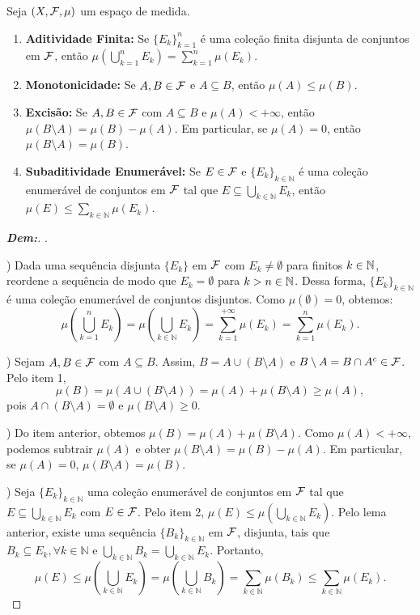 \begin{prop*}{}
Seja $(X, \mathcal{F}, \mu)$ um espaço de medida.
\begin{enumerate}
    \item[1)] \textbf{Aditividade Finita:} Se $\{E_k\}_{k=1}^n$ é uma coleção finita disjunta de conjuntos em $\mathcal{F}$, então $\mu\left(\bigcup_{k=1}^n E_k\right) = \sum_{k=1}^n \mu(E_k)$.
    \item[2)] \textbf{Monotonicidade:} Se $A, B \in \mathcal{F}$ e $A \subseteq B$, então $\mu(A) \le \mu(B)$.
    \item[3)] \textbf{Excisão:} Se $A, B \in \mathcal{F}$ com $A \subseteq B$ e $\mu(A) < +\infty$, então $\mu(B \setminus A) = \mu(B) - \mu(A)$. Em particular, se $\mu(A) = 0$, então $\mu(B \setminus A) = \mu(B)$.
    \item[4)] \textbf{Subaditividade Enumerável:} Se $E \in \mathcal{F}$ e $\{E_k\}_{k \in \mathbb{N}}$ é uma coleção enumerável de conjuntos em $\mathcal{F}$ tal que $E \subseteq \bigcup_{k \in \mathbb{N}} E_k$, então $\mu(E) \le \sum_{k \in \mathbb{N}} \mu(E_k)$.
\end{enumerate}
\end{prop*}

\begin{proof}[\textbf{Dem:}]. 

) Dada uma sequência disjunta $\{E_k\}$ em $\mathcal F$
  com $E_k \neq \emptyset$ para finitos $k \in \mathbb N$, 
  reordene a sequência de modo que $E_k = \emptyset$ para $k > n \in \mathbb N$. 
  Dessa forma, $\{E_k\}_{k \in \mathbb{N}}$ é uma coleção enumerável
  de conjuntos disjuntos. Como $\mu(\emptyset) = 0$, obtemos:
$$ \mu\left(\bigcup_{k=1}^n E_k\right) = \mu\left(\bigcup_{k \in \mathbb{N}} E_k\right) = \sum_{k=1}^{+\infty} \mu(E_k) = \sum_{k=1}^n \mu(E_k). $$

) Sejam $A, B \in \mathcal{F}$ com $A \subseteq B$. Assim, $B = A \cup (B \setminus A)$ e $B \setminus A = B \cap A^c \in \mathcal{F}$. Pelo item 1,
$$ \mu(B) = \mu(A \cup (B \setminus A)) = \mu(A) + \mu(B \setminus A) \ge \mu(A), $$
pois $A \cap (B \setminus A) = \emptyset$ e $\mu(B \setminus A) \ge 0$.

) Do item anterior, obtemos $\mu(B) = \mu(A) + \mu(B \setminus A)$. Como $\mu(A) < +\infty$, podemos subtrair $\mu(A)$ e obter $\mu(B \setminus A) = \mu(B) - \mu(A)$. Em particular, se $\mu(A) = 0$, $\mu(B \setminus A) = \mu(B)$.

) Seja $\{E_k\}_{k \in \mathbb{N}}$ uma coleção enumerável de conjuntos em $\mathcal{F}$ tal que $E \subseteq \bigcup_{k \in \mathbb{N}} E_k$ com $E \in \mathcal{F}$. Pelo item 2, $\mu(E) \le \mu\left(\bigcup_{k \in \mathbb{N}} E_k\right)$. Pelo lema anterior, existe uma sequência $\{B_k\}_{k \in \mathbb{N}}$ em $\mathcal{F}$, disjunta, tais que $B_k \subseteq E_k, \forall k \in \mathbb{N}$ e $\bigcup_{k \in \mathbb{N}} B_k = \bigcup_{k \in \mathbb{N}} E_k$. Portanto,
$$ \mu(E) \le \mu\left(\bigcup_{k \in \mathbb{N}} E_k\right) = \mu\left(\bigcup_{k \in \mathbb{N}} B_k\right) = \sum_{k \in \mathbb{N}} \mu(B_k) \le \sum_{k \in \mathbb{N}} \mu(E_k). $$
\end{proof}

